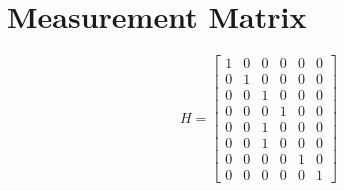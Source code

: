 \section{Measurement Matrix}\label{sec:appendix-ekf-measurement}
\begin{equation*}%
H = \begin{bmatrix}%
1 & 0 & 0 & 0 & 0 & 0 \\%
0 & 1 & 0 & 0 & 0 & 0 \\%
0 & 0 & 1 & 0 & 0 & 0 \\%
0 & 0 & 0 & 1 & 0 & 0 \\%
0 & 0 & 1 & 0 & 0 & 0 \\%
0 & 0 & 1 & 0 & 0 & 0 \\%
0 & 0 & 0 & 0 & 1 & 0 \\%
0 & 0 & 0 & 0 & 0 & 1%
\end{bmatrix}%
\end{equation*}

